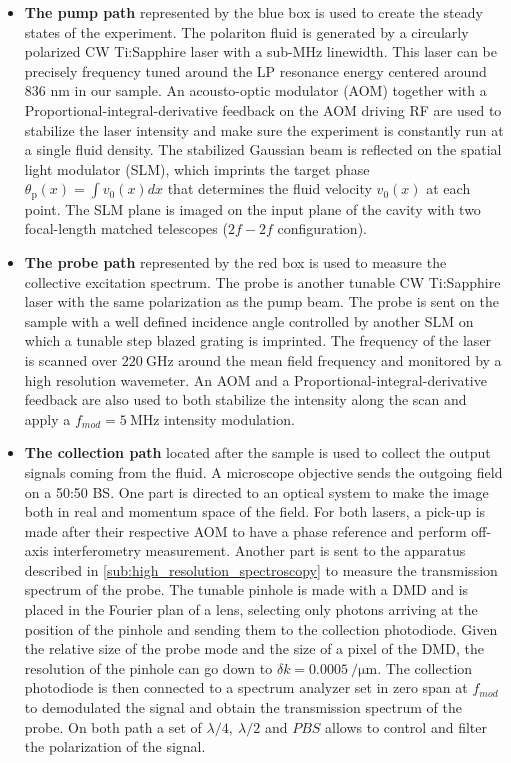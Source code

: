  \begin{itemize}
    \item \textbf{The pump path} represented by the blue box is used to create the steady states of the experiment. The polariton fluid is generated by a circularly polarized CW Ti:Sapphire laser with a sub-MHz linewidth. This laser can be precisely frequency tuned around the LP resonance energy centered around 836 nm in our sample. An acousto-optic modulator (AOM) 
    together with a Proportional-integral-derivative feedback on the AOM driving RF are used to stabilize the laser intensity and make sure the experiment is constantly run at a single fluid density.
    The stabilized Gaussian beam is reflected on the spatial light modulator (SLM), which imprints the target phase $\theta_\mathrm{p}(x)=\int v_0(x)dx$ that determines the fluid velocity $v_0(x)$ at each point. The SLM plane is imaged on the input plane of the cavity with two focal-length matched telescopes ($2f-2f$ configuration).
    \item \textbf{The probe path} represented by the red box is used to measure the collective excitation spectrum. The probe is another tunable CW Ti:Sapphire laser with the same polarization as the pump beam. The probe is sent on the sample with a well defined incidence angle controlled by another SLM on which a tunable step blazed grating is imprinted. The frequency of
    the laser is scanned over $\SI{220}{\giga\hertz}$ around the mean field frequency and monitored by a high resolution wavemeter. An AOM and a Proportional-integral-derivative feedback are also used to both stabilize the intensity along the scan and apply a $f_{mod}=\SI{5}{\mega\hertz}$ intensity modulation.
    \item \textbf{The collection path} located after the sample is used to collect the output signals coming from the fluid. A microscope objective sends the outgoing field on a 50:50 BS. One part is directed to an optical system to make the image both in real and momentum space of the field. For both lasers, a pick-up is made after their respective AOM to have a phase reference and perform off-axis interferometry measurement. Another part is sent to the apparatus described in \autoref{sub:high_resolution_spectroscopy} to measure the transmission spectrum of the probe. The tunable
    pinhole is made with a DMD and is placed in the Fourier plan of a lens, selecting only photons arriving at the position of the pinhole and sending them to the collection photodiode. Given 
    the relative size of the probe mode and the size of a pixel of the DMD, the resolution of the pinhole can go down to $\delta k = \SI{0.0005}{\per \micro\meter}$. The collection photodiode is then connected to a spectrum analyzer set in zero span at $f_{mod}$ to demodulated the signal and obtain the transmission spectrum of the probe. On both path
    a set of $\lambda/4,\ \lambda/2$ and $PBS$ allows to control and filter the polarization of the signal.  
 \end{itemize}

